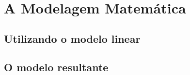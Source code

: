 \chapter{A Modelagem Matemática}
\label{chap:a_modelagem_matematica}


\section{Utilizando o modelo linear}
\label{sec:a_modelagem_matematica_utilizando_o_modelo_linear}


\section{O modelo resultante}
\label{sec:a_modelagem_matematica_o_modelo_resultante}

